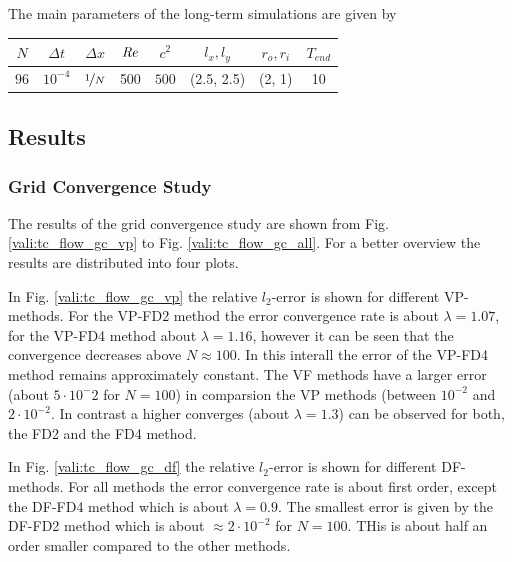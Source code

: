 The main parameters of the long-term simulations are  given by

\begin{center}
\vspace*{0.7ex}
\begin{tabular}{c|c|c|c|c|c|c|c }
 $ N  $                   & $\Delta t$ & $\Delta x$            & $\mbox{\textit{Re}}$  & $c^2$   & $l_x, l_y$ &$r_o, r_i$ & $T_{end}$\\
\hline
 $96 $& $10^{-4}$ & $\nicefrac{1}{N}$ & 500     & $500$   & (2.5, 2.5)  & (2, 1)    & 10\\
\end{tabular}
\vspace*{0.7ex}
\end{center}

\clearpage

\subsection{Results}

\subsubsection{Grid Convergence Study}


The results of the grid convergence study are shown from Fig. \ref{vali:tc_flow_gc_vp} to Fig. \ref{vali:tc_flow_gc_all}.
For a better overview the results are distributed into four plots.

In Fig. \ref{vali:tc_flow_gc_vp} the relative $l_2$-error is shown for different VP-methods.
For the VP-FD2 method the error convergence rate is about $\lambda=1.07$,
for the VP-FD4 method about $\lambda=1.16$, however it can be seen that the convergence decreases above $N\approx100$.
In this interall the error of the VP-FD4 method remains approximately constant.
The VF methods have a larger error (about $5\cdot 10^-2$ for $N=100$) in comparsion the VP methods
(between $10^{-2}$ and $2\cdot10^{-2}$.
In contrast a higher converges (about $\lambda=1.3$) can be observed for both, the FD2 and the FD4 method.

In Fig. \ref{vali:tc_flow_gc_df} the relative $l_2$-error is shown for different DF-methods.
For all methods the error convergence rate is about first order, except the DF-FD4 method which is about $\lambda=0.9$.
The smallest error is given by the DF-FD2 method which is about $\approx 2 \cdot 10^{-2}$ for $N=100$.
THis is about half an order smaller compared to the other methods.

